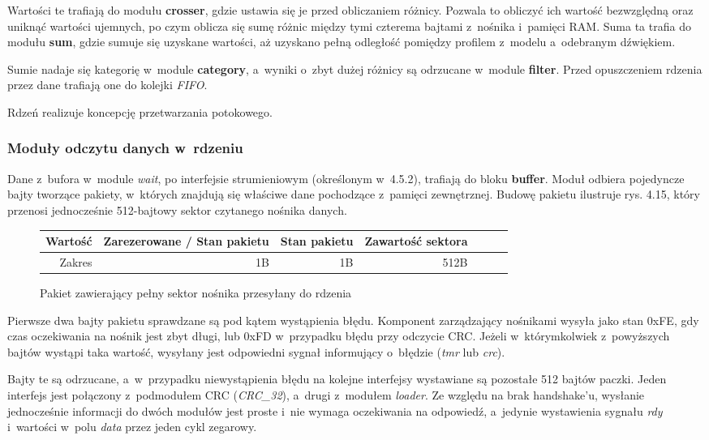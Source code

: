 Wartości te trafiają do modułu \textbf{crosser}, gdzie ustawia się je przed obliczaniem różnicy. Pozwala to obliczyć ich wartość bezwzględną oraz uniknąć wartości ujemnych, po czym oblicza się sumę różnic między tymi czterema bajtami z~nośnika i~pamięci RAM. Suma ta trafia do modułu \textbf{sum}, gdzie sumuje się uzyskane wartości, aż uzyskano pełną odległość pomiędzy profilem z~modelu a~odebranym dźwiękiem.

Sumie nadaje się kategorię w~module \textbf{category}, a~wyniki o~zbyt dużej różnicy są odrzucane w~module \textbf{filter}. Przed opuszczeniem rdzenia przez dane trafiają one do kolejki \textit{FIFO}.


\FloatBarrier %

Rdzeń realizuje koncepcję przetwarzania potokowego.

\subsubsection{Moduły odczytu danych w~rdzeniu}
Dane z~bufora w~module \textit{wait}, po interfejsie strumieniowym (określonym w~4.5.2), trafiają do bloku \textbf{buffer}. Moduł odbiera pojedyncze bajty tworzące pakiety, w~których znajdują się właściwe dane pochodzące z~pamięci zewnętrznej. Budowę pakietu ilustruje rys. 4.15, który przenosi jednocześnie 512-bajtowy sektor czytanego nośnika danych.

\begin{figure}[h]
	\centering
	\begin{tabular}{|r|r|r|r|r|r|r|}
		\hline
		Wartość & Zarezerowane / Stan pakietu & Stan pakietu & Zawartość sektora    \\
		\hline
		Zakres & 1B & 1B & 512B \\
		\hline
	\end{tabular}
	
	\caption{Pakiet zawierający pełny sektor nośnika przesyłany do rdzenia}
\end{figure}

Pierwsze dwa bajty pakietu sprawdzane są pod kątem wystąpienia błędu. Komponent zarządzający nośnikami wysyła jako stan 0xFE, gdy czas oczekiwania na nośnik jest zbyt długi, lub 0xFD w~przypadku błędu przy odczycie CRC. Jeżeli w~którymkolwiek z~powyższych bajtów wystąpi taka wartość, wysyłany jest odpowiedni sygnał informujący o~błędzie (\textit{tmr} lub \textit{crc}).

Bajty te są odrzucane, a~w~przypadku niewystąpienia błędu na kolejne interfejsy wystawiane są pozostałe 512 bajtów paczki. Jeden interfejs jest połączony z~podmodułem CRC (\textit{CRC\_32}), a~drugi z~modułem \textit{loader}. Ze względu na brak handshake'u, wysłanie jednocześnie informacji do dwóch modułów jest proste i~nie wymaga oczekiwania na odpowiedź, a~jedynie wystawienia sygnału \textit{rdy} i~wartości w~polu \textit{data} przez jeden cykl zegarowy.

